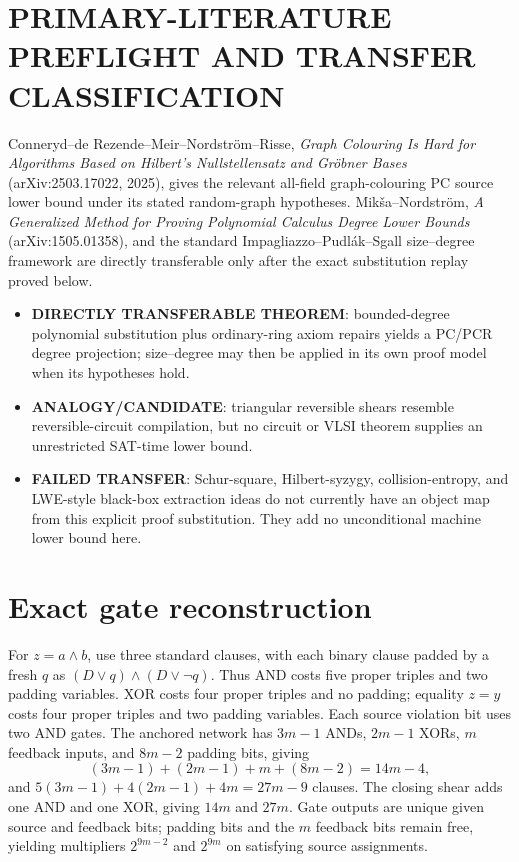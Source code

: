 \documentclass[11pt]{article}
\newcommand{\status}[1]{\textbf{#1}}
\begin{document}
\section*{PRIMARY-LITERATURE PREFLIGHT AND TRANSFER CLASSIFICATION}
Conneryd--de Rezende--Meir--Nordstr\"om--Risse, \emph{Graph Colouring Is Hard for Algorithms Based on Hilbert's Nullstellensatz and Gr\"obner Bases} (arXiv:2503.17022, 2025), gives the relevant all-field graph-colouring PC source lower bound under its stated random-graph hypotheses.  Mik\v{s}a--Nordstr\"om, \emph{A Generalized Method for Proving Polynomial Calculus Degree Lower Bounds} (arXiv:1505.01358), and the standard Impagliazzo--Pudl\'ak--Sgall size--degree framework are directly transferable only after the exact substitution replay proved below.

\begin{itemize}
\item \status{DIRECTLY TRANSFERABLE THEOREM}: bounded-degree polynomial substitution plus ordinary-ring axiom repairs yields a PC/PCR degree projection; size--degree may then be applied in its own proof model when its hypotheses hold.
\item \status{ANALOGY/CANDIDATE}: triangular reversible shears resemble reversible-circuit compilation, but no circuit or VLSI theorem supplies an unrestricted SAT-time lower bound.
\item \status{FAILED TRANSFER}: Schur-square, Hilbert-syzygy, collision-entropy, and LWE-style black-box extraction ideas do not currently have an object map from this explicit proof substitution.  They add no unconditional machine lower bound here.
\end{itemize}

\section*{Exact gate reconstruction}
For $z=a\wedge b$, use three standard clauses, with each binary clause padded by a fresh $q$ as $(D\vee q)\wedge(D\vee\neg q)$.  Thus AND costs five proper triples and two padding variables.  XOR costs four proper triples and no padding; equality $z=y$ costs four proper triples and two padding variables.  Each source violation bit uses two AND gates.  The anchored network has $3m-1$ ANDs, $2m-1$ XORs, $m$ feedback inputs, and $8m-2$ padding bits, giving
\[
(3m-1)+(2m-1)+m+(8m-2)=14m-4,
\]
and $5(3m-1)+4(2m-1)+4m=27m-9$ clauses.  The closing shear adds one AND and one XOR, giving $14m$ and $27m$.  Gate outputs are unique given source and feedback bits; padding bits and the $m$ feedback bits remain free, yielding multipliers $2^{9m-2}$ and $2^{9m}$ on satisfying source assignments.
\end{document}
